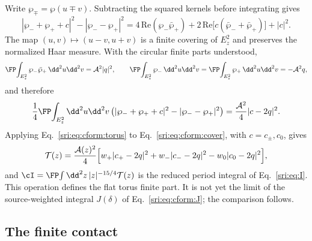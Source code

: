 Write $\wp_\mp=\wp(u\mp v)$. Subtracting the squared kernels before integrating gives
\begin{equation}
 |\wp_-+\wp_++c|^2-|\wp_--\wp_+|^2=4\,\mathrm{Re}(\wp_-\bar\wp_+)+2\,\mathrm{Re}\bigl[c(\bar\wp_-+\bar\wp_+)\bigr]+|c|^2.
\end{equation}
The map $(u,v)\mapsto(u-v,u+v)$ is a finite covering of $E_z^2$ and preserves the normalized Haar measure. With the
circular finite parts understood,
\begin{equation}
 \FP\!\int_{E_z^2}\wp_-\bar\wp_+\,\dd^2u\dd^2v=\mathcal A^2|q|^2,\qquad
 \FP\!\int_{E_z^2}\wp_-\,\dd^2u\dd^2v=\FP\!\int_{E_z^2}\wp_+\,\dd^2u\dd^2v=-\mathcal A^2q,
\end{equation}
and therefore
\begin{equation}
 \frac14\FP\!\int_{E_z^2}\dd^2u\dd^2v\,\bigl(|\wp_-+\wp_++c|^2-|\wp_--\wp_+|^2\bigr)=\frac{\mathcal A^2}{4}|c-2q|^2.
 \label{sri:eq:cform:torus}
\end{equation}
Applying Eq.~\eqref{sri:eq:cform:torus} to Eq.~\eqref{sri:eq:cform:cover}, with $c=c_\pm,c_0$, gives
\begin{equation}
 \mathcal T(z)=\frac{\mathcal A(z)^2}{4}\Bigl[w_+|c_+-2q|^2+w_-|c_--2q|^2-w_0|c_0-2q|^2\Bigr],
\end{equation}
and $\cI=\FP\!\int\dd^2z\,|z|^{-15/4}\mathcal T(z)$ is the reduced period integral of Eq.~\eqref{sri:eq:I}. This operation
defines the flat torus finite part. It is not yet the limit of the source-weighted integral $J(\delta)$ of
Eq.~\eqref{sri:eq:cform:J}; the comparison follows.

\subsection{The finite contact}\label{sri:app:cform:contact}
